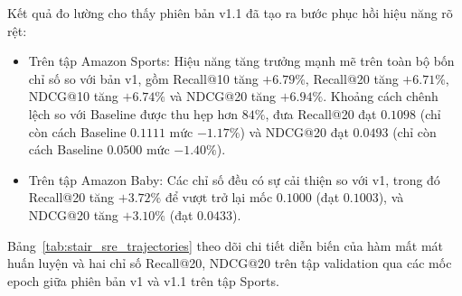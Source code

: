 Kết quả đo lường cho thấy phiên bản v1.1 đã tạo ra bước phục hồi hiệu năng rõ rệt:
\begin{itemize}[leftmargin=*]
    \item Trên tập Amazon Sports: Hiệu năng tăng trưởng mạnh mẽ trên toàn bộ bốn chỉ số so với bản v1, gồm Recall@10 tăng $+6.79\%$, Recall@20 tăng $+6.71\%$, NDCG@10 tăng $+6.74\%$ và NDCG@20 tăng $+6.94\%$. Khoảng cách chênh lệch so với Baseline được thu hẹp hơn $84\%$, đưa Recall@20 đạt $0.1098$ (chỉ còn cách Baseline $0.1111$ mức $-1.17\%$) và NDCG@20 đạt $0.0493$ (chỉ còn cách Baseline $0.0500$ mức $-1.40\%$).
    \item Trên tập Amazon Baby: Các chỉ số đều có sự cải thiện so với v1, trong đó Recall@20 tăng $+3.72\%$ để vượt trở lại mốc $0.1000$ (đạt $0.1003$), và NDCG@20 tăng $+3.10\%$ (đạt $0.0433$).
\end{itemize}

Bảng~\ref{tab:stair_sre_trajectories} theo dõi chi tiết diễn biến của hàm mất mát huấn luyện và hai chỉ số Recall@20, NDCG@20 trên tập validation qua các mốc epoch giữa phiên bản v1 và v1.1 trên tập Sports.

